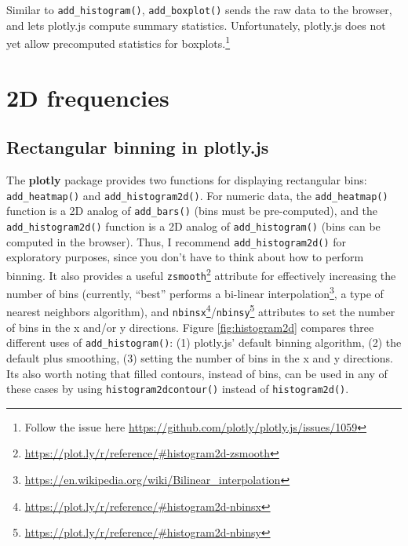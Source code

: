 \documentclass[
  12pt,
]{krantz}
\renewcommand{\href}[2]{#2\footnote{\url{#1}}}
\begin{document}
Similar to \texttt{add\_histogram()}, \texttt{add\_boxplot()} sends the raw data to the browser, and lets plotly.js compute summary statistics. Unfortunately, plotly.js does not yet allow precomputed statistics for boxplots.\footnote{Follow the issue here \url{https://github.com/plotly/plotly.js/issues/1059}}

\hypertarget{frequencies-2D}{%
\chapter{2D frequencies}\label{frequencies-2D}}

\hypertarget{rectangular-binning-in-plotly.js}{%
\section{Rectangular binning in plotly.js}\label{rectangular-binning-in-plotly.js}}

The \textbf{plotly} package provides two functions for displaying rectangular bins: \texttt{add\_heatmap()} and \texttt{add\_histogram2d()}. For numeric data, the \texttt{add\_heatmap()} function is a 2D analog of \texttt{add\_bars()} (bins must be pre-computed), and the \texttt{add\_histogram2d()} function is a 2D analog of \texttt{add\_histogram()} (bins can be computed in the browser). Thus, I recommend \texttt{add\_histogram2d()} for exploratory purposes, since you don't have to think about how to perform binning. It also provides a useful \href{https://plot.ly/r/reference/\#histogram2d-zsmooth}{\texttt{zsmooth}} attribute for effectively increasing the number of bins (currently, ``best'' performs a \href{https://en.wikipedia.org/wiki/Bilinear_interpolation}{bi-linear interpolation}, a type of nearest neighbors algorithm), and \href{https://plot.ly/r/reference/\#histogram2d-nbinsx}{\texttt{nbinsx}}/\href{https://plot.ly/r/reference/\#histogram2d-nbinsy}{\texttt{nbinsy}} attributes to set the number of bins in the x and/or y directions. Figure \ref{fig:histogram2d} compares three different uses of \texttt{add\_histogram()}: (1) plotly.js' default binning algorithm, (2) the default plus smoothing, (3) setting the number of bins in the x and y directions. Its also worth noting that filled contours, instead of bins, can be used in any of these cases by using \texttt{histogram2dcontour()} instead of \texttt{histogram2d()}.
\end{document}
